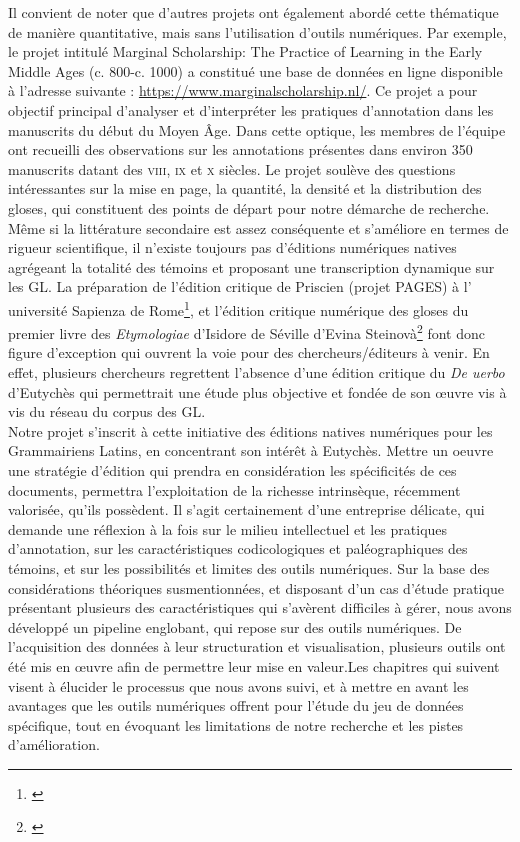 \documentclass[a4paper, twoside, 12pt]{book}
\begin{document}
Il convient de noter que d'autres projets ont également abordé cette thématique de manière quantitative, mais sans l'utilisation d'outils numériques. Par exemple, le projet intitulé \og{}Marginal Scholarship: The Practice of Learning in the Early Middle Ages (c. 800-c. 1000)\fg{} a constitué une base de données en ligne disponible à l'adresse suivante : \url{https://www.marginalscholarship.nl/}. Ce projet a pour objectif principal d'analyser et d'interpréter les pratiques d'annotation dans les manuscrits du début du Moyen Âge. Dans cette optique, les membres de l'équipe ont recueilli des observations sur les annotations présentes dans environ 350 manuscrits datant des  \textsc{viii}\ieme{}, \textsc{ix}\ieme{} et \textsc{x}\ieme{} siècles. Le projet soulève des questions intéressantes sur la mise en page, la quantité, la densité et la distribution des gloses, qui constituent des points de départ pour notre démarche de recherche.\\

Même si la littérature secondaire est assez conséquente et s’améliore en termes de rigueur scientifique, il n’existe toujours pas d’éditions numériques natives agrégeant la totalité des témoins et proposant une transcription \og{} dynamique \fg{} sur les GL. La préparation de l’édition critique de Priscien (projet PAGES) à l’ université Sapienza de Rome\footnote{\cite{monella2019digital}}, et l'édition critique numérique des gloses du premier livre des \textit{Etymologiae} d'Isidore de Séville d'Evina Steinovà\footnote{\cite{steinova2021glosses}} font donc figure d’exception qui ouvrent la voie pour des chercheurs/éditeurs à venir. En effet, plusieurs chercheurs regrettent l’absence d’une édition critique du \textit{De uerbo} d’Eutychès qui permettrait une étude plus objective et fondée de son œuvre vis à vis du réseau du corpus des GL.\\ 

Notre projet s’inscrit à cette initiative des éditions natives numériques pour les Grammairiens Latins, en concentrant son intérêt à Eutychès. Mettre un oeuvre une stratégie d'édition qui prendra en considération les spécificités de ces documents, permettra l'exploitation de la richesse intrinsèque, récemment valorisée, qu'ils possèdent. Il s'agit certainement d'une entreprise délicate, qui demande une réflexion à la fois sur le milieu intellectuel et les pratiques d'annotation, sur les caractéristiques codicologiques et paléographiques des témoins, et sur les possibilités et limites des outils numériques. Sur la base des considérations théoriques susmentionnées, et disposant d'un cas d'étude pratique présentant plusieurs des caractéristiques qui s'avèrent difficiles à gérer, nous avons développé un pipeline englobant, qui repose sur des outils numériques. De l'acquisition des données à leur structuration et visualisation, plusieurs outils ont été mis en œuvre afin de permettre leur mise en valeur.Les chapitres qui suivent visent à élucider le processus que nous avons suivi, et à mettre en avant les avantages que les outils numériques offrent pour l'étude du jeu de données spécifique, tout en évoquant les limitations de notre recherche et les pistes d'amélioration.\\
\end{document}
